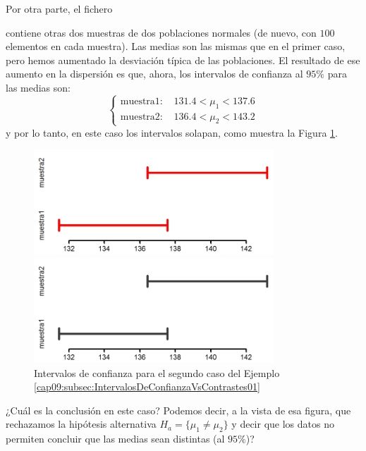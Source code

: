 \begin{ejemplo}
Por otra parte, el fichero \begin{center}
\end{center}
contiene otras dos muestras de dos poblaciones normales (de nuevo, con $100$ elementos en cada muestra). Las medias son las mismas que en el primer caso, pero hemos aumentado la desviación típica de las poblaciones. El resultado de ese aumento en la dispersión es que, ahora, los intervalos de confianza al $95\%$ para las medias son:
\[
\begin{cases}
\mbox{muestra1: }&131.4<\mu_1<137.6\\
\mbox{muestra2: }&136.4<\mu_2<143.2
\end{cases}
\]
y por lo tanto, en este caso los intervalos solapan, como muestra la Figura
\ref{cap09:fig:IntervalosDeConfianzaVsContrastes02}.
\begin{figure}[ht]
\begin{center}
\begin{enColor}
\includegraphics[width=9cm]{../fig/Cap09-IntervalosVsContrastes02.png}
\end{enColor}
\begin{bn}
\includegraphics[width=9cm]{../fig/Cap09-IntervalosVsContrastes02-bn.png}
\end{bn}
\caption{Intervalos de confianza para el segundo caso del Ejemplo \ref{cap09:subsec:IntervalosDeConfianzaVsContrastes01}}
\label{cap09:fig:IntervalosDeConfianzaVsContrastes02}
\end{center}
\end{figure}
¿Cuál es la conclusión en este caso? Podemos decir, a la vista de esa figura, que rechazamos la hipótesis alternativa $H_a=\{\mu_1\neq \mu_2\}$ y decir que los datos no permiten concluir que las medias sean distintas (al $95\%$)?


\end{ejemplo}
